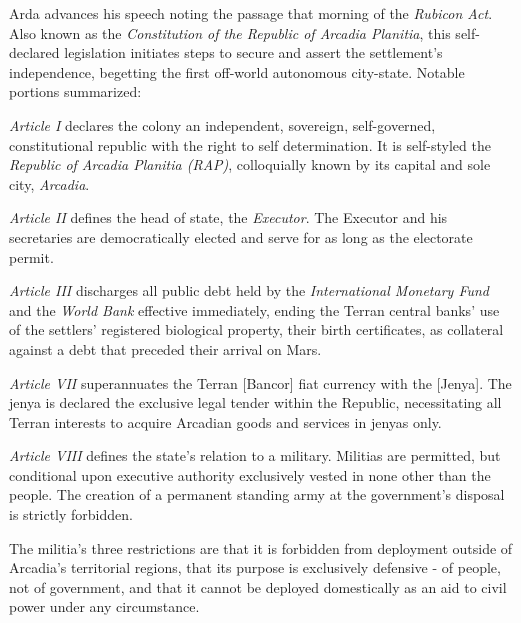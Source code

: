 Arda advances his speech noting the passage that morning of the {\it Rubicon Act}. Also known as the {\it Constitution of the Republic of Arcadia Planitia}, this self-declared legislation initiates steps to secure and assert the settlement's independence, begetting the first off-world autonomous city-state. Notable portions summarized:

\startTimelineDocument
\startitemize[5]
\setupwhitespace[big]
\item {\it Article I} declares the colony an independent, sovereign, self-governed, constitutional republic with the right to self determination. It is self-styled the {\it Republic of Arcadia Planitia (RAP)}, colloquially known by its capital and sole city, {\it Arcadia}.

\item {\it Article II} defines the head of state, the {\it Executor}. The Executor and his secretaries are democratically elected and serve for as long as the electorate permit.

\item {\it Article III} discharges all public debt held by the {\it International Monetary Fund} and the {\it World Bank} effective immediately, ending the Terran central banks' use of the settlers' registered biological property, their birth certificates, as collateral against a debt that preceded their arrival on Mars.

\item {\it Article VII} superannuates the Terran [Bancor] fiat currency with the [Jenya]. The jenya is declared the exclusive legal tender within the Republic, necessitating all Terran interests to acquire Arcadian goods and services in jenyas only.

\item {\it Article VIII} defines the state's relation to a military. Militias are permitted, but conditional upon executive authority exclusively vested in none other than the people. The creation of a permanent standing army at the government's disposal is strictly forbidden.

The militia's three restrictions are that it is forbidden from deployment outside of Arcadia's territorial regions, that its purpose is exclusively defensive - of people, not of government, and that it cannot be deployed domestically as an aid to civil power under any circumstance.

